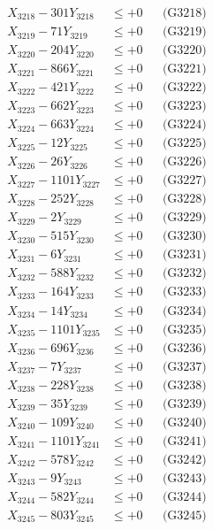 \documentclass[a4paper,10pt]{article}
\begin{document}
{\begin{align}
X_{3218} - 301Y_{3218} &\leq +0 && \text{(G3218)} \\
X_{3219} - 71Y_{3219} &\leq +0 && \text{(G3219)} \\
X_{3220} - 204Y_{3220} &\leq +0 && \text{(G3220)} \\
\allowbreak
X_{3221} - 866Y_{3221} &\leq +0 && \text{(G3221)} \\
X_{3222} - 421Y_{3222} &\leq +0 && \text{(G3222)} \\
X_{3223} - 662Y_{3223} &\leq +0 && \text{(G3223)} \\
X_{3224} - 663Y_{3224} &\leq +0 && \text{(G3224)} \\
X_{3225} - 12Y_{3225} &\leq +0 && \text{(G3225)} \\
X_{3226} - 26Y_{3226} &\leq +0 && \text{(G3226)} \\
X_{3227} - 1101Y_{3227} &\leq +0 && \text{(G3227)} \\
X_{3228} - 252Y_{3228} &\leq +0 && \text{(G3228)} \\
X_{3229} - 2Y_{3229} &\leq +0 && \text{(G3229)} \\
X_{3230} - 515Y_{3230} &\leq +0 && \text{(G3230)} \\
\allowbreak
X_{3231} - 6Y_{3231} &\leq +0 && \text{(G3231)} \\
X_{3232} - 588Y_{3232} &\leq +0 && \text{(G3232)} \\
X_{3233} - 164Y_{3233} &\leq +0 && \text{(G3233)} \\
X_{3234} - 14Y_{3234} &\leq +0 && \text{(G3234)} \\
X_{3235} - 1101Y_{3235} &\leq +0 && \text{(G3235)} \\
X_{3236} - 696Y_{3236} &\leq +0 && \text{(G3236)} \\
X_{3237} - 7Y_{3237} &\leq +0 && \text{(G3237)} \\
X_{3238} - 228Y_{3238} &\leq +0 && \text{(G3238)} \\
X_{3239} - 35Y_{3239} &\leq +0 && \text{(G3239)} \\
X_{3240} - 109Y_{3240} &\leq +0 && \text{(G3240)} \\
\allowbreak
X_{3241} - 1101Y_{3241} &\leq +0 && \text{(G3241)} \\
X_{3242} - 578Y_{3242} &\leq +0 && \text{(G3242)} \\
X_{3243} - 9Y_{3243} &\leq +0 && \text{(G3243)} \\
X_{3244} - 582Y_{3244} &\leq +0 && \text{(G3244)} \\
X_{3245} - 803Y_{3245} &\leq +0 && \text{(G3245)} \\

\end{align}}
\end{document}
